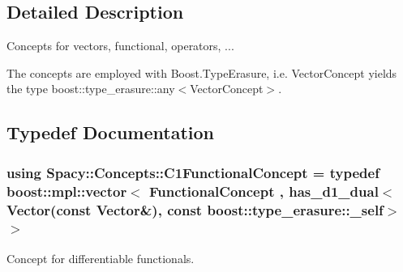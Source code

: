 

\subsection{Detailed Description}
Concepts for vectors, functional, operators, ... 

The concepts are employed with Boost.\+Type\+Erasure, i.\+e. Vector\+Concept yields the type boost\+::type\+\_\+erasure\+::any$<$\+Vector\+Concept$>$. 

\subsection{Typedef Documentation}
\hypertarget{group__ConceptGroup_ga205b55d8291e0f2e143f116cf78bc54f_ga205b55d8291e0f2e143f116cf78bc54f}{}
\subsubsection[{C1\+Functional\+Concept}]{\setlength{\rightskip}{0pt plus 5cm}using {\bf Spacy\+::\+Concepts\+::\+C1\+Functional\+Concept} = typedef boost\+::mpl\+::vector$<$ Functional\+Concept , has\+\_\+d1\+\_\+dual$<$Vector(const Vector\&), const boost\+::type\+\_\+erasure\+::\+\_\+self$>$ $>$}\label{group__ConceptGroup_ga205b55d8291e0f2e143f116cf78bc54f_ga205b55d8291e0f2e143f116cf78bc54f}


Concept for differentiable functionals. 

